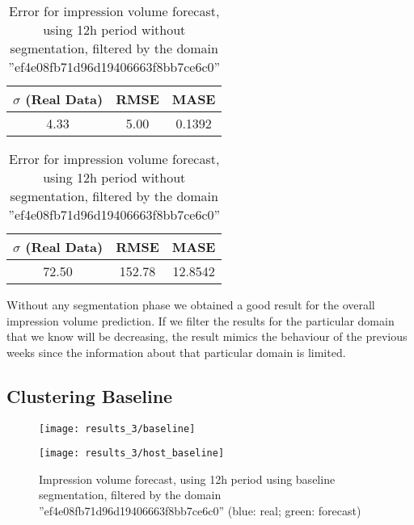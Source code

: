 \begin{table}[!ht]
\centering
\footnotesize
\begin{minipage}[t]{0.45\linewidth}
\centering
\footnotesize
\begin{tabular}{ccc}
 $\sigma$ (Real Data) & RMSE & MASE   \\ \hline
4.33 & 5.00 & 0.1392 \\
\end{tabular}

\vspace{0.5cm}

\caption[Volume
impression forecast, safari]{Error for impression volume
forecast, using 12h period without segmentation }
\label{tab:err_domain_wo_segmentation}
\end{minipage}
\quad
\begin{minipage}[t]{0.45\linewidth}
\centering
\footnotesize
\begin{tabular}{ccc}
 $\sigma$ (Real Data) & RMSE & MASE   \\ \hline
72.50 & 152.78 & 12.8542 \\
\end{tabular}

\vspace{0.5cm}

\caption[Volume
impression forecast, safari]{Error for impression volume
forecast, using 12h period without segmentation, filtered by the domain ''ef4e08fb71d96d19406663f8bb7ce6c0'' }
\label{tab:err_domain_wo_segmentation_filtered}
\end{minipage}

\end{table}

Without any segmentation phase we obtained a good result for the overall
impression volume prediction. If we filter the results for the particular
domain
that we know will be decreasing, the result mimics the behaviour of the previous
weeks since the information about that particular domain is limited.

\subsection*{Clustering Baseline}

\begin{figure}[!ht]
\centering
\begin{minipage}[t]{0.45\linewidth}
\texttt{[image: results\_3/baseline]} \caption[Volume
impression forecast, domain, cluster by baseline]{Impression volume
forecast, using 12h period using baseline segmentation  (blue: real; green: forecast)}
\label{fig:domain_w_baseline}
\end{minipage}
\quad
\begin{minipage}[t]{0.45\linewidth}
\texttt{[image: results\_3/host\_baseline]} \caption[Volume
impression forecast, domain, cluster by baseline, filtered]{Impression volume
forecast, using 12h period using baseline segmentation, filtered by the domain ''ef4e08fb71d96d19406663f8bb7ce6c0'' (blue: real; green: forecast)}
\label{fig:domain_w_baseline_filtered}
\end{minipage}

\end{figure}

